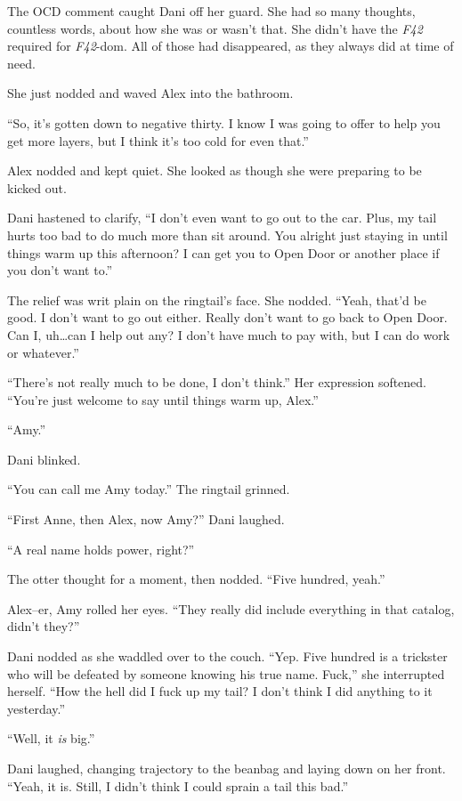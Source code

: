 The OCD comment caught Dani off her guard. She had so many thoughts, countless words, about how she was or wasn't that. She didn't have the \emph{F42} required for \emph{F42}-dom. All of those had disappeared, as they always did at time of need.

She just nodded and waved Alex into the bathroom.

\secdiv{}

\noindent ``So, it's gotten down to negative thirty. I know I was going to offer to help you get more layers, but I think it's too cold for even that.''

Alex nodded and kept quiet. She looked as though she were preparing to be kicked out.

Dani hastened to clarify, ``I don't even want to go out to the car. Plus, my tail hurts too bad to do much more than sit around. You alright just staying in until things warm up this afternoon? I can get you to Open Door or another place if you don't want to.''

The relief was writ plain on the ringtail's face. She nodded. ``Yeah, that'd be good. I don't want to go out either. Really don't want to go back to Open Door. Can I, uh\ldots{}can I help out any? I don't have much to pay with, but I can do work or whatever.''

``There's not really much to be done, I don't think.'' Her expression softened. ``You're just welcome to say until things warm up, Alex.''

``Amy.''

Dani blinked.

``You can call me Amy today.'' The ringtail grinned.

``First Anne, then Alex, now Amy?'' Dani laughed.

``A real name holds power, right?''

The otter thought for a moment, then nodded. ``Five hundred, yeah.''

Alex--er, Amy rolled her eyes. ``They really did include everything in that catalog, didn't they?''

Dani nodded as she waddled over to the couch. ``Yep. Five hundred is a trickster who will be defeated by someone knowing his true name. Fuck,'' she interrupted herself. ``How the hell did I fuck up my tail? I don't think I did anything to it yesterday.''

``Well, it \emph{is} big.''

Dani laughed, changing trajectory to the beanbag and laying down on her front. ``Yeah, it is. Still, I didn't think I could sprain a tail this bad.''

